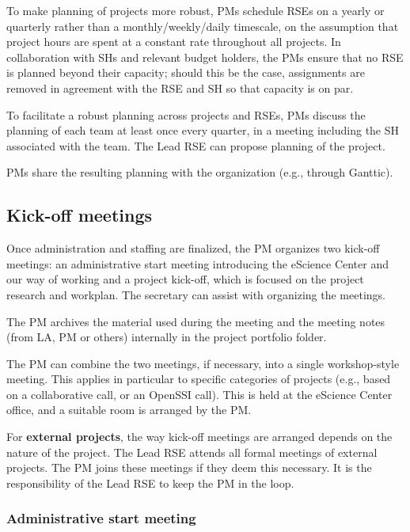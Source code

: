 \documentclass[11pt]{article}
\begin{document}
To make planning of projects more robust, PMs schedule RSEs on a yearly or quarterly rather than a monthly/weekly/daily
timescale, on the assumption that project hours are spent at a constant rate throughout all projects. In collaboration
with SHs and relevant budget holders, the PMs ensure that no RSE is planned beyond their capacity; should this be the
case, assignments are removed in agreement with the RSE and SH so that capacity is on par.

To facilitate a robust planning across projects and RSEs, PMs discuss the planning of each team at least once every
quarter, in a meeting including the SH associated with the team. The Lead RSE can propose planning of the project.

PMs share the resulting planning with the organization (e.g., through Ganttic).


\subsection{Kick-off meetings}
Once administration and staffing are finalized, the PM organizes two kick-off meetings: an administrative start meeting
introducing the eScience Center and our way of working and a project kick-off, which is focused on the project research
and workplan. The secretary can assist with organizing the meetings.

The PM archives the material used during the meeting and the meeting notes (from LA, PM or others) internally in the
project portfolio folder.

The PM can combine the two meetings, if necessary, into a single workshop-style meeting. This applies in particular to
specific categories of projects (e.g., based on a collaborative call, or an OpenSSI call). This is held at the eScience
Center office, and a suitable room is arranged by the PM.

For \textbf{external projects}, the way kick-off meetings are arranged depends on the nature of the project. The Lead
RSE attends all formal meetings of external projects. The PM joins these meetings if they deem this necessary. It is
the responsibility of the Lead RSE to keep the PM in the loop.

\subsubsection{Administrative start meeting}
\end{document}
